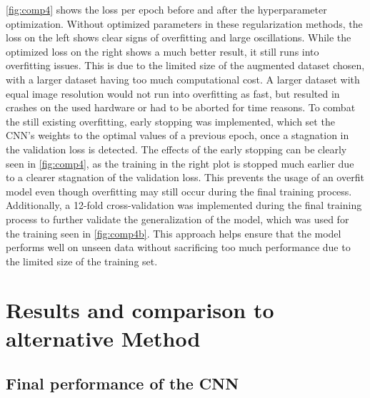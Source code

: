 \noindent
\autoref{fig:comp4} shows the loss per epoch before and after the hyperparameter optimization. Without optimized parameters in these regularization methods, the loss on the left shows clear signs of overfitting and large oscillations. While the optimized loss on the right shows a much better result, it still runs into overfitting issues. This is due to the limited size of the augmented dataset chosen, with a larger dataset having too much computational cost. A larger dataset with equal image resolution would not run into overfitting as fast, but resulted in crashes on the used hardware or had to be aborted for time reasons. To combat the still existing overfitting, early stopping was implemented, which set the CNN's weights to the optimal values of a previous epoch, once a stagnation in the validation loss is detected. The effects of the early stopping can be clearly seen in \autoref{fig:comp4}, as the training in the right plot is stopped much earlier due to a clearer stagnation of the validation loss. This prevents the usage of an overfit model even though overfitting may still occur during the final training process.
Additionally, a 12-fold cross-validation was implemented during the final training process to further validate the generalization of the model, which was used for the training seen in \autoref{fig:comp4b}. This approach helps ensure that the model performs well on unseen data without sacrificing too much performance due to the limited size of the training set. 
\section{Results and comparison to alternative Method}
    \label{sec:3}
\subsection{Final performance of the CNN}

